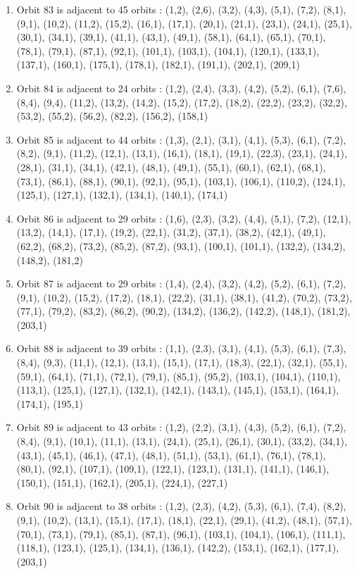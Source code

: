 \documentclass[12pt]{article}
\begin{document}
\begin{enumerate}
\item Orbit 83 is adjacent to 45 orbits : (1,2), (2,6), (3,2), (4,3), (5,1), (7,2), (8,1), (9,1), (10,2), (11,2), (15,2), (16,1), (17,1), (20,1), (21,1), (23,1), (24,1), (25,1), (30,1), (34,1), (39,1), (41,1), (43,1), (49,1), (58,1), (64,1), (65,1), (70,1), (78,1), (79,1), (87,1), (92,1), (101,1), (103,1), (104,1), (120,1), (133,1), (137,1), (160,1), (175,1), (178,1), (182,1), (191,1), (202,1), (209,1)
\item Orbit 84 is adjacent to 24 orbits : (1,2), (2,4), (3,3), (4,2), (5,2), (6,1), (7,6), (8,4), (9,4), (11,2), (13,2), (14,2), (15,2), (17,2), (18,2), (22,2), (23,2), (32,2), (53,2), (55,2), (56,2), (82,2), (156,2), (158,1)
\item Orbit 85 is adjacent to 44 orbits : (1,3), (2,1), (3,1), (4,1), (5,3), (6,1), (7,2), (8,2), (9,1), (11,2), (12,1), (13,1), (16,1), (18,1), (19,1), (22,3), (23,1), (24,1), (28,1), (31,1), (34,1), (42,1), (48,1), (49,1), (55,1), (60,1), (62,1), (68,1), (73,1), (86,1), (88,1), (90,1), (92,1), (95,1), (103,1), (106,1), (110,2), (124,1), (125,1), (127,1), (132,1), (134,1), (140,1), (174,1)
\item Orbit 86 is adjacent to 29 orbits : (1,6), (2,3), (3,2), (4,4), (5,1), (7,2), (12,1), (13,2), (14,1), (17,1), (19,2), (22,1), (31,2), (37,1), (38,2), (42,1), (49,1), (62,2), (68,2), (73,2), (85,2), (87,2), (93,1), (100,1), (101,1), (132,2), (134,2), (148,2), (181,2)
\item Orbit 87 is adjacent to 29 orbits : (1,4), (2,4), (3,2), (4,2), (5,2), (6,1), (7,2), (9,1), (10,2), (15,2), (17,2), (18,1), (22,2), (31,1), (38,1), (41,2), (70,2), (73,2), (77,1), (79,2), (83,2), (86,2), (90,2), (134,2), (136,2), (142,2), (148,1), (181,2), (203,1)
\item Orbit 88 is adjacent to 39 orbits : (1,1), (2,3), (3,1), (4,1), (5,3), (6,1), (7,3), (8,4), (9,3), (11,1), (12,1), (13,1), (15,1), (17,1), (18,3), (22,1), (32,1), (55,1), (59,1), (64,1), (71,1), (72,1), (79,1), (85,1), (95,2), (103,1), (104,1), (110,1), (113,1), (125,1), (127,1), (132,1), (142,1), (143,1), (145,1), (153,1), (164,1), (174,1), (195,1)
\item Orbit 89 is adjacent to 43 orbits : (1,2), (2,2), (3,1), (4,3), (5,2), (6,1), (7,2), (8,4), (9,1), (10,1), (11,1), (13,1), (24,1), (25,1), (26,1), (30,1), (33,2), (34,1), (43,1), (45,1), (46,1), (47,1), (48,1), (51,1), (53,1), (61,1), (76,1), (78,1), (80,1), (92,1), (107,1), (109,1), (122,1), (123,1), (131,1), (141,1), (146,1), (150,1), (151,1), (162,1), (205,1), (224,1), (227,1)
\item Orbit 90 is adjacent to 38 orbits : (1,2), (2,3), (4,2), (5,3), (6,1), (7,4), (8,2), (9,1), (10,2), (13,1), (15,1), (17,1), (18,1), (22,1), (29,1), (41,2), (48,1), (57,1), (70,1), (73,1), (79,1), (85,1), (87,1), (96,1), (103,1), (104,1), (106,1), (111,1), (118,1), (123,1), (125,1), (134,1), (136,1), (142,2), (153,1), (162,1), (177,1), (203,1)

\end{enumerate}
\end{document}
